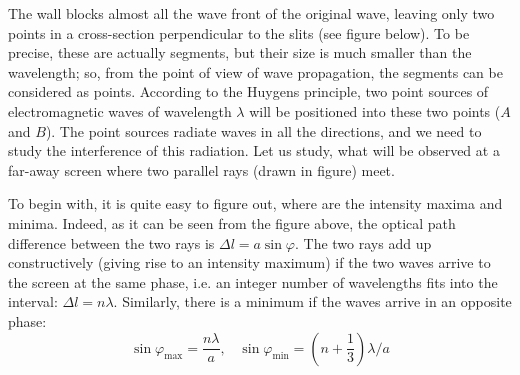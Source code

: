 \begin{custom-simple}[Problem 2]
The wall blocks almost all the wave front of the original wave, leaving only two points in a cross-section perpendicular to the slits (see figure below). To be precise, these are actually segments, but their size is much smaller than the wavelength; so, from the point of view of wave propagation, the segments can be considered as points. According to the Huygens principle, two point sources of electromagnetic waves of wavelength $\lambda$ will be positioned into these two points ($A$ and $B$). The point sources radiate waves in all the directions, and we need to study the interference of this radiation. Let us study, what will be observed at a far-away screen where two parallel rays (drawn in figure) meet.
\vspace{3mm}

To begin with, it is quite easy to figure out, where are the intensity maxima and minima. Indeed, as it can be seen from the figure above, the optical path difference between the two rays is $\Delta l = a \sin\varphi$. The two rays add up constructively (giving rise to an intensity maximum) if the two waves arrive to the screen at the same phase, i.e. an integer number of wavelengths fits into the interval: $\Delta l = n\lambda$. Similarly, there is a minimum if the waves arrive in an opposite phase:
\[\sin\varphi_{\text{max}} = \frac{n\lambda}{a},\hspace{10pt} \sin\varphi_{\text{min}} = \left(n + \frac{1}{3}\right)\lambda/a\]
\end{custom-simple}